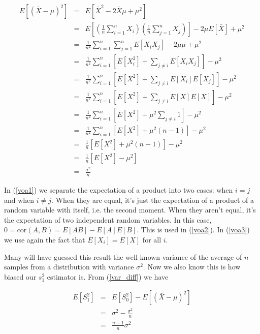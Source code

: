 \documentclass[]{article}
\begin{document}
\begin{eqnarray}
E \left[ (\bar{X} - \mu)^2 \right] &= &E \left[ \bar{X}^2 - 2 \bar{X} \mu + \mu^2 \right] \nonumber \\
   &= & E \left[ \left( \frac{1}{n} \sum_{i=1}^n X_i \right) 
       \left( \frac{1}{n} \sum_{j=1}^n X_j \right) \right]
       - 2 \mu E[\bar{X}] + \mu^2  \nonumber \\
   &= & \frac{1}{n^2} \sum_{i=1}^n \sum_{j=1}^n  E \left[ X_i X_j \right]
       - 2 \mu \mu + \mu^2  \nonumber \\
   &= & \frac{1}{n^2} \sum_{i=1}^n \left[ E[X_i^2] + \sum_{j \ne i}  E \left[ X_i X_j \right] \right]
       - \mu^2 \label{voa1}  \\
   &= & \frac{1}{n^2} \sum_{i=1}^n \left[ E[X^2] + \sum_{j \ne i}  E \left[X_i \right] E \left[X_j \right] \right]
       - \mu^2 \label{voa2}  \\
   &= & \frac{1}{n^2} \sum_{i=1}^n \left[ E[X^2] + \sum_{j \ne i}  E \left[X \right] E \left[X \right] \right]
       - \mu^2  \label{voa3}  \\
   &= & \frac{1}{n^2} \sum_{i=1}^n \left[ E[X^2] + \mu^2 \sum_{j \ne i} 1 \right] - \mu^2 \nonumber \\
   &= & \frac{1}{n^2} \sum_{i=1}^n \left[ E[X^2] + \mu^2 (n-1) \right] - \mu^2 \nonumber \\
   &= & \frac{1}{n} \left[ E[X^2] + \mu^2 (n-1) \right] - \mu^2 \nonumber \\
   &= & \frac{1}{n} \left[ E[X^2] - \mu^2 \right]  \nonumber \\
   &= & \frac{\sigma^2}{n}
\end{eqnarray}

In (\ref{voa1}) we separate the expectation of a product into two cases:
when $i=j$ and when $i \ne j$.  When they are equal, it's just the expectation of a
product of a random variable with itself, i.e. the second moment.  When they aren't
equal, it's the expectation of two independent random variables.  In this case,
$0 = \mbox{cor}(A,B) = E[AB] - E[A]E[B]$.  This is used in (\ref{voa2}).  In
(\ref{voa3}) we use again the fact that $E[X_i] = E[X]$ for all $i$.

Many will have guessed this result the well-known variance of the average 
of $n$ samples from a distribution with variance $\sigma^2$.  Now we also
know this is how biased our $s_1^2$ estimator is.  From (\ref{var_diff})
we have

\begin{eqnarray}
E \left[ S_1^2 \right] &= & E \left[ S_0^2 \right] - E \left[ (\bar{X} - \mu)^2 \right] \nonumber \\
   &= & \sigma^2 - \frac{\sigma^2}{n} \nonumber \\
   &= & \frac{n-1}{n} \sigma^2 \label{es1} 
\end{eqnarray}
\end{document}
